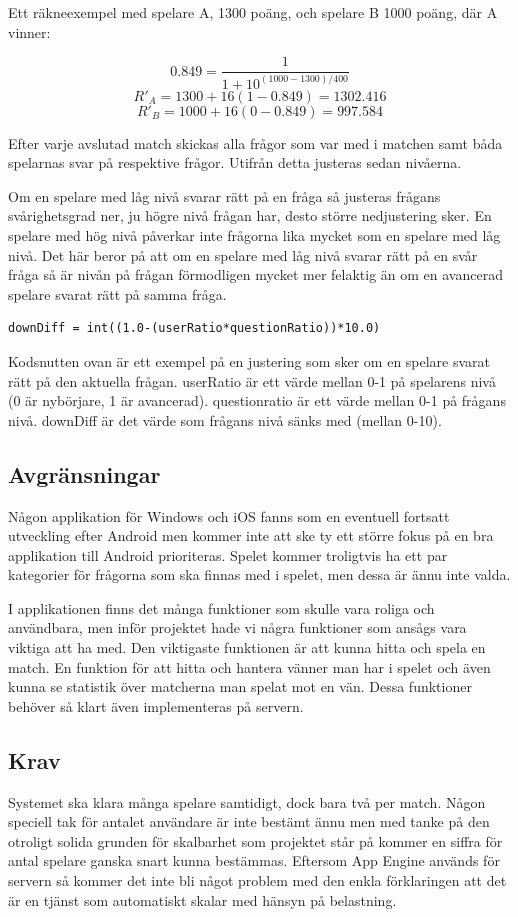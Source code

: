 \documentclass[a4paper, 11pt]{article}
\begin{document}
Ett räkneexempel med spelare A, 1300 poäng, och spelare B 1000 poäng, där A vinner:

$$0.849 = \frac{1}{1+10^{(1000-1300)/400}}$$
$$ R'_A = 1300 + 16(1-0.849) = 1302.416 $$
$$ R'_B = 1000 + 16(0-0.849) = 997.584 $$

Efter varje avslutad match skickas alla frågor som var med i matchen samt båda spelarnas svar på respektive frågor. Utifrån detta justeras sedan nivåerna.

Om en spelare med låg nivå svarar rätt på en fråga så justeras frågans svårighetsgrad ner, ju högre nivå frågan har, desto större nedjustering sker. En spelare med hög nivå påverkar inte frågorna lika mycket som en spelare med låg nivå. Det här beror på att om en spelare med låg nivå svarar rätt på en svår fråga så är nivån på frågan förmodligen mycket mer felaktig än om en avancerad spelare svarat rätt på samma fråga. 

\begin{verbatim}
downDiff = int((1.0-(userRatio*questionRatio))*10.0)
\end{verbatim}

Kodsnutten ovan är ett exempel på en justering som sker om en spelare svarat rätt på den aktuella frågan. userRatio är ett värde mellan 0-1 på spelarens nivå (0 är nybörjare, 1 är avancerad). questionratio är ett värde mellan 0-1 på frågans nivå. downDiff är det värde som frågans nivå sänks med (mellan 0-10). 

\subsection{Avgränsningar}
Någon applikation för Windows och iOS fanns som en eventuell fortsatt utveckling efter Android men kommer inte att ske ty ett större fokus på en bra applikation till Android prioriteras. Spelet kommer troligtvis ha ett par kategorier för frågorna som ska finnas med i spelet, men dessa är ännu inte valda. 

I applikationen finns det många funktioner som skulle vara roliga och användbara, men inför projektet hade vi några funktioner som ansågs vara viktiga att ha med. Den viktigaste funktionen är att kunna hitta och spela en match. En funktion för att hitta och hantera vänner man har i spelet och även kunna se statistik över matcherna man spelat mot en vän. Dessa funktioner behöver så klart även implementeras på servern.

\subsection{Krav}
Systemet ska klara många spelare samtidigt, dock bara två per match. Någon speciell tak för antalet användare är inte bestämt ännu men med tanke på den otroligt solida grunden för skalbarhet som projektet står på kommer en siffra för antal spelare ganska snart kunna bestämmas. Eftersom App Engine används för servern så kommer det inte bli något problem med den enkla förklaringen att det är en tjänst som automatiskt skalar med hänsyn på belastning. \cite{appenginescalability}
\end{document}
